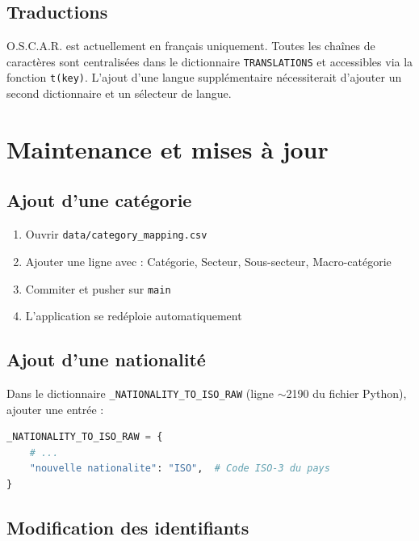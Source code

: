 \documentclass[12pt,a4paper,twoside]{article}
\begin{document}
\subsection{Traductions}

O.S.C.A.R. est actuellement en fran\c{c}ais uniquement. Toutes les cha\^{i}nes de caract\`{e}res sont centralis\'{e}es dans le dictionnaire \texttt{TRANSLATIONS} et accessibles via la fonction \texttt{t(key)}. L'ajout d'une langue suppl\'{e}mentaire n\'{e}cessiterait d'ajouter un second dictionnaire et un s\'{e}lecteur de langue.

\section{Maintenance et mises \`{a} jour}

\subsection{Ajout d'une cat\'{e}gorie}

\begin{enumerate}[leftmargin=2em]
  \item Ouvrir \texttt{data/category\_mapping.csv}
  \item Ajouter une ligne avec : Cat\'{e}gorie, Secteur, Sous-secteur, Macro-cat\'{e}gorie
  \item Commiter et pusher sur \texttt{main}
  \item L'application se red\'{e}ploie automatiquement
\end{enumerate}

\subsection{Ajout d'une nationalit\'{e}}

Dans le dictionnaire \texttt{\_NATIONALITY\_TO\_ISO\_RAW} (ligne $\sim$2190 du fichier Python), ajouter une entr\'{e}e :

\begin{lstlisting}[language=Python]
_NATIONALITY_TO_ISO_RAW = {
    # ...
    "nouvelle nationalite": "ISO",  # Code ISO-3 du pays
}
\end{lstlisting}

\subsection{Modification des identifiants}
\end{document}
